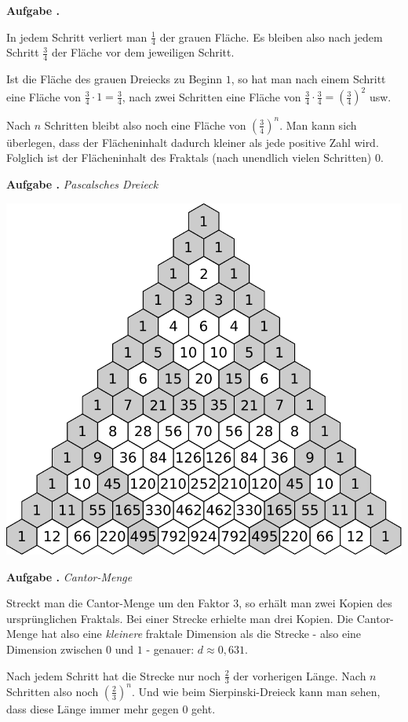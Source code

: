 \documentclass[a4paper,ngerman,12pt]{scrartcl}
\theoremstyle{definition}
\theoremstyle{plain}
\theoremstyle{remark}
\newlength{\aufgabenskip}
\newcounter{aufgabennummer}
\newenvironment{aufgabe}[1]{
  \addtocounter{aufgabennummer}{1}
  \textbf{Aufgabe \theaufgabennummer.} \emph{#1} \par
}{\vspace{\aufgabenskip}}
\begin{document}
\begin{aufgabe}{}
	In jedem Schritt verliert man $\frac{1}{4}$ der grauen Fläche. Es bleiben also nach jedem Schritt $\frac{3}{4}$ der Fläche vor dem jeweiligen Schritt.
	
	Ist die Fläche des grauen Dreiecks zu Beginn $1$, so hat man nach einem Schritt eine Fläche von $\frac{3}{4}\cdot 1 = \frac{3}{4}$, nach zwei Schritten eine Fläche von $\frac{3}{4} \cdot \frac{3}{4} = \left(\frac{3}{4}\right)^2$ usw.
	
	Nach $n$ Schritten bleibt also noch eine Fläche von $\left(\frac{3}{4}\right)^n$. Man kann sich überlegen, dass der Flächeninhalt dadurch kleiner als jede positive Zahl wird. Folglich ist der Flächeninhalt des Fraktals (\glqq nach unendlich vielen Schritten\grqq) $0$.
\end{aufgabe}

\begin{aufgabe}{Pascalsches Dreieck}
	\begin{center}
		\includegraphics[width=.6\textwidth]{Bilder/Pascalsches-Dreieck-gefuellt-grau.pdf}
	\end{center}
\end{aufgabe}

\begin{aufgabe}{Cantor-Menge}
	Streckt man die Cantor-Menge um den Faktor $3$, so erhält man zwei Kopien des ursprünglichen Fraktals. Bei einer Strecke erhielte man drei Kopien. Die Cantor-Menge hat also eine \emph{kleinere} fraktale Dimension als die Strecke - also eine Dimension zwischen $0$ und $1$ - genauer: $d \approx 0,631$.
	
	Nach jedem Schritt hat die Strecke nur noch $\frac{2}{3}$ der vorherigen Länge. Nach $n$ Schritten also noch $\left(\frac{2}{3}\right)^n$. Und wie beim Sierpinski-Dreieck kann man sehen, dass diese Länge immer mehr gegen $0$ geht.
\end{aufgabe}
\end{document}
